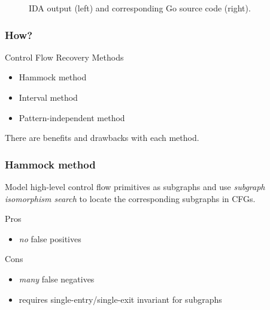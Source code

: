 \documentclass[aspectratio=1610]{beamer}
\begin{document}
\begin{frame}
\begin{figure}[htbp]
\begin{subfigure}[ht]{0.30\textwidth}
		\end{subfigure}
		\begin{subfigure}[ht]{0.40\textwidth}
			\centering
			
		\end{subfigure}
		\caption{IDA output (left) and corresponding Go source code (right).}
	\end{figure}
\end{frame}




\begin{frame}
	\frametitle{How?}

	\begin{block}{Control Flow Recovery Methods}
		\begin{itemize}
			\item Hammock method
			\item Interval method
			\item Pattern-independent method
		\end{itemize}
	\end{block}

	There are benefits and drawbacks with each method.
\end{frame}


\begin{frame}
	\frametitle{Hammock method}

	Model high-level control flow primitives as subgraphs and use \textit{subgraph isomorphism search} to locate the corresponding subgraphs in CFGs.

	\vspace*{2em}

	\begin{block}{Pros}
		\begin{itemize}
			\item \textit{no} false positives
		\end{itemize}
	\end{block}

	\begin{block}{Cons}
		\begin{itemize}
			\item \textit{many} false negatives
			\item requires single-entry/single-exit invariant for subgraphs
		\end{itemize}
	\end{block}

\end{frame}
\end{document}

